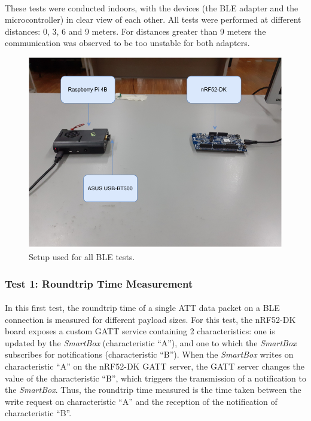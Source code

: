 \paragraph{} These tests were conducted indoors, with the devices (the \acs{BLE} adapter and the microcontroller) in clear view of each other. All tests were performed at different distances: 0, 3, 6 and 9 meters. For distances greater than 9 meters the communication was observed to be too unstable for both adapters. 

\begin{figure}[H]
    \centering
    \includegraphics[width=0.75\linewidth]{images/ble test setup.pdf}
    \caption{Setup used for all \acs{BLE} tests.}
    \label{fig:ble-test-setup}
\end{figure}

\subsubsection{Test 1: Roundtrip Time Measurement}

\paragraph{} In this first test, the roundtrip time of a single \acs{ATT} data packet on a \acs{BLE} connection is measured for different payload sizes. For this test, the nRF52-DK board exposes a custom \acs{GATT} service containing 2 characteristics: one is updated by the \textit{SmartBox} (characteristic ``A''), and one to which the \textit{SmartBox} subscribes for notifications (characteristic ``B''). When the \textit{SmartBox} writes on characteristic ``A'' on the nRF52-DK \acs{GATT} server, the \acs{GATT} server changes the value of the characteristic ``B'', which triggers the transmission of a notification to the \textit{SmartBox}. Thus, the roundtrip time measured is the time taken between the write request on characteristic ``A'' and the reception of the notification of characteristic ``B''. 

